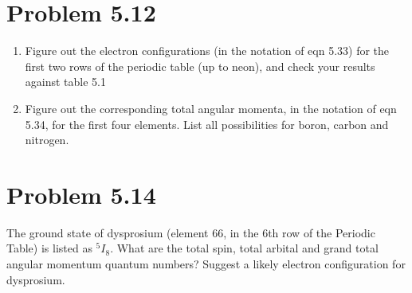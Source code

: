 \documentclass[../main.tex]{subfiles}
\begin{document}
\section{Problem 5.12}

\begin{enumerate}
    \item Figure out the electron configurations (in the notation of eqn 5.33) for the first two rows of the periodic table (up to neon), and check your results against table 5.1
    \item Figure out the corresponding total angular momenta, in the notation of eqn 5.34, for the first four elements.
        List all possibilities for boron, carbon and nitrogen.
\end{enumerate}

\section{Problem 5.14}

The ground state of dysprosium (element 66, in the 6th row of the Periodic Table) is listed as $^5I_8$.
What are the total spin, total arbital and grand total angular momentum quantum numbers?
Suggest a likely electron configuration for dysprosium.
\end{document}
